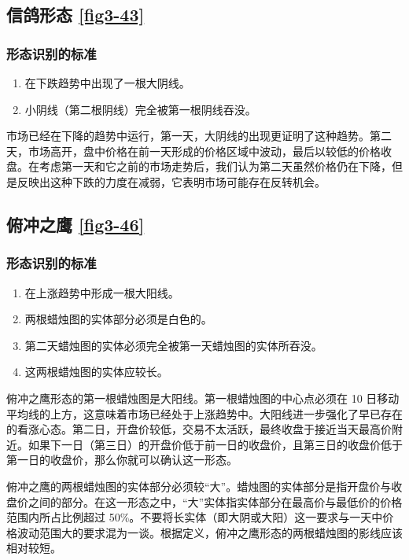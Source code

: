 \subsection{信鸽形态 \autoref{fig3-43}}
\subsubsection*{形态识别的标准}
\begin{enumerate}
    \item 在下跌趋势中出现了一根大阴线。
    \item 小阴线（第二根阴线）完全被第一根阴线吞没。
\end{enumerate}

市场已经在下降的趋势中运行，第一天，大阴线的出现更证明了这种趋势。第二天，市场高开，盘中价格在前一天形成的价格区域中波动，最后以较低的价格收盘。在考虑第一天和它之前的市场走势后，我们认为第二天虽然价格仍在下降，但是反映出这种下跌的力度在减弱，它表明市场可能存在反转机会。
\subsection{俯冲之鹰 \autoref{fig3-46}}
\subsubsection*{形态识别的标准}
\begin{enumerate}
    \item 在上涨趋势中形成一根大阳线。
    \item 两根蜡烛图的实体部分必须是白色的。
    \item 第二天蜡烛图的实体必须完全被第一天蜡烛图的实体所吞没。
    \item 这两根蜡烛图的实体应较长。
\end{enumerate}

俯冲之鹰形态的第一根蜡烛图是大阳线。第一根蜡烛图的中心点必须在 10 日移动平均线的上方，这意味着市场已经处于上涨趋势中。大阳线进一步强化了早已存在的看涨心态。第二日，开盘价较低，交易不太活跃，最终收盘于接近当天最高价附近。如果下一日（第三日）的开盘价低于前一日的收盘价，且第三日的收盘价低于第一日的收盘价，那么你就可以确认这一形态。

俯冲之鹰的两根蜡烛图的实体部分必须较“大”。蜡烛图的实体部分是指开盘价与收盘价之间的部分。在这一形态之中，“大”实体指实体部分在最高价与最低价的价格范围内所占比例超过 50\%。不要将长实体（即大阴或大阳）这一要求与一天中价格波动范围大的要求混为一谈。根据定义，俯冲之鹰形态的两根蜡烛图的影线应该相对较短。

